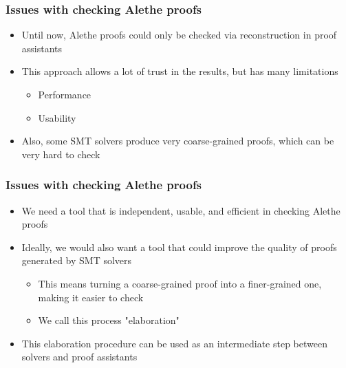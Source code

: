 \documentclass[usepdftitle=false,aspectratio=169]{beamer}
\newcommand\vitem{\vfill\item}
\begin{document}
\begin{frame}
  \frametitle{Issues with checking Alethe proofs}
  \begin{itemize}
    \item Until now, Alethe proofs could only be checked via reconstruction in
    proof assistants
    \vitem This approach allows a lot of trust in the results, but has many
    limitations
    \begin{itemize}
      \item Performance
      \item Usability
    \end{itemize}
    \vitem Also, some SMT solvers produce very coarse-grained proofs, which can
    be very hard to check
  \end{itemize}
\end{frame}

\begin{frame}
  \frametitle{Issues with checking Alethe proofs}
  \begin{itemize}
    \item We need a tool that is independent, usable, and efficient in checking
    Alethe proofs
    \vitem Ideally, we would also want a tool that could improve the quality of
    proofs generated by SMT solvers
    \begin{itemize}
      \item This means turning a coarse-grained proof into a finer-grained
        one, making it easier to check
      \item We call this process "elaboration"
    \end{itemize}
    \vitem This elaboration procedure can be used as an intermediate step
    between solvers and proof assistants
  \end{itemize}
\end{frame}
\end{document}
